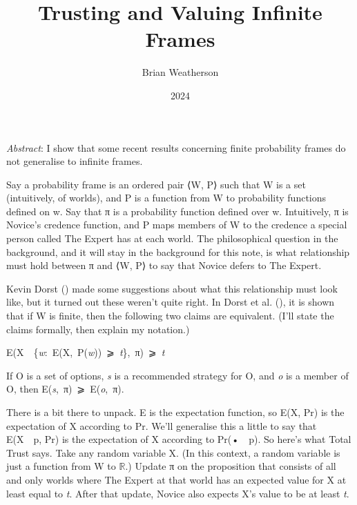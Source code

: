 \documentclass[
  11pt,
  letterpaper,
  DIV=11,
  numbers=noendperiod,
  twoside]{scrartcl}
\title{Trusting and Valuing Infinite Frames}
\author{Brian Weatherson}
\date{2024}
\providecommand{\tightlist}{%
  \setlength{\itemsep}{0pt}\setlength{\parskip}{0pt}}\usepackage{longtable,booktabs,array}
\renewenvironment{abstract}
 {\vspace{-1.25cm}
 \quotation\small\noindent\emph{Abstract}:}
 {\endquotation}
\begin{document}
\maketitle
\begin{abstract}
I show that some recent results concerning finite probability frames do
not generalise to infinite frames.
\end{abstract}


Say a probability frame is an ordered pair ⟨W, P⟩ such that W is a set
(intuitively, of worlds), and P is a function from W to probability
functions defined on w. Say that π is a probability function defined
over w. Intuitively, π is Novice's credence function, and P maps members
of W to the credence a special person called The Expert has at each
world. The philosophical question in the background, and it will stay in
the background for this note, is what relationship must hold between π
and ⟨W, P⟩ to say that Novice defers to The Expert.

Kevin Dorst () made some suggestions about
what this relationship must look like, but it turned out these weren't
quite right. In Dorst et al. (), it is
shown that if W is finite, then the following two claims are equivalent.
(I'll state the claims formally, then explain my notation.)

\begin{description}
\tightlist
\item[Total Trust]
E(X~\textbar~\{\emph{w}:~E(X,~P(\emph{w}))~⩾~\emph{t}\},~π)~⩾~\emph{t}
\item[Value]
If O is a set of options, \emph{s} is a recommended strategy for O, and
\emph{o} is a member of O, then E(\emph{s},~π)~⩾~E(\emph{o},~π).
\end{description}

There is a bit there to unpack. E is the expectation function, so E(X,
Pr) is the expectation of X according to Pr. We'll generalise this a
little to say that E(X~\textbar~p, Pr) is the expectation of X according
to Pr(•~\textbar~p). So here's what Total Trust says. Take any random
variable X. (In this context, a random variable is just a function from
W to \(\mathbb{R}\).) Update π on the proposition that consists of all
and only worlds where The Expert at that world has an expected value for
X at least equal to \emph{t}. After that update, Novice also expects X's
value to be at least \emph{t}.
\end{document}
